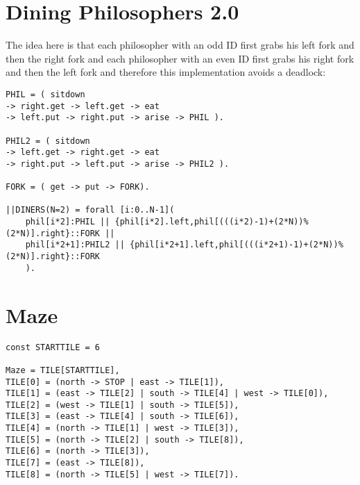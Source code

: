 \documentclass{report}
\begin{document}
	\section{Dining Philosophers 2.0}
	\startsection
		The idea here is that each philosopher with an odd ID first grabs his left fork and then the right fork and each philosopher with an even ID first grabs his right fork and then the left fork and therefore this implementation avoids a deadlock:
		\begin{verbatim}
PHIL = ( sitdown
-> right.get -> left.get -> eat
-> left.put -> right.put -> arise -> PHIL ).

PHIL2 = ( sitdown
-> left.get -> right.get -> eat
-> right.put -> left.put -> arise -> PHIL2 ).

FORK = ( get -> put -> FORK).

||DINERS(N=2) = forall [i:0..N-1]( 
	phil[i*2]:PHIL || {phil[i*2].left,phil[(((i*2)-1)+(2*N))%(2*N)].right}::FORK || 
	phil[i*2+1]:PHIL2 || {phil[i*2+1].left,phil[(((i*2+1)-1)+(2*N))%(2*N)].right}::FORK 
	).
		\end{verbatim}
	\closesection
	
	\section{Maze}
	\startsection
		\begin{verbatim}
const STARTTILE = 6

Maze = TILE[STARTTILE],
TILE[0] = (north -> STOP | east -> TILE[1]),
TILE[1] = (east -> TILE[2] | south -> TILE[4] | west -> TILE[0]),
TILE[2] = (west -> TILE[1] | south -> TILE[5]),
TILE[3] = (east -> TILE[4] | south -> TILE[6]),
TILE[4] = (north -> TILE[1] | west -> TILE[3]),
TILE[5] = (north -> TILE[2] | south -> TILE[8]),
TILE[6] = (north -> TILE[3]),
TILE[7] = (east -> TILE[8]),
TILE[8] = (north -> TILE[5] | west -> TILE[7]).
		\end{verbatim}
	\closesection
\end{document}
